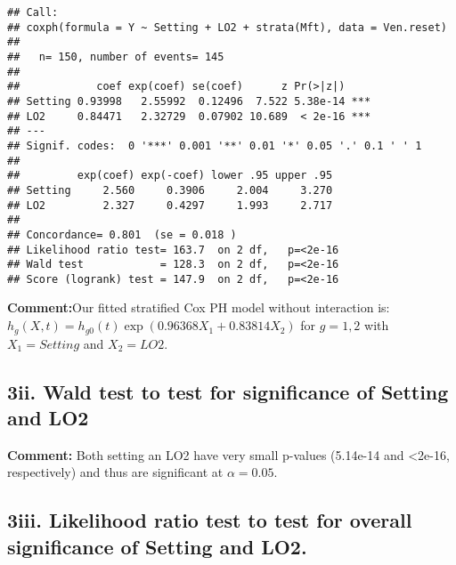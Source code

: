 \documentclass[
]{article}
\newenvironment{Shaded}{\begin{snugshade}}{\end{snugshade}}
\newcommand{\AttributeTok}[1]{\textcolor[rgb]{0.77,0.63,0.00}{#1}}
\newcommand{\CommentTok}[1]{\textcolor[rgb]{0.56,0.35,0.01}{\textit{#1}}}
\newcommand{\DecValTok}[1]{\textcolor[rgb]{0.00,0.00,0.81}{#1}}
\newcommand{\FunctionTok}[1]{\textcolor[rgb]{0.00,0.00,0.00}{#1}}
\newcommand{\NormalTok}[1]{#1}
\newcommand{\OtherTok}[1]{\textcolor[rgb]{0.56,0.35,0.01}{#1}}
\newcommand{\SpecialCharTok}[1]{\textcolor[rgb]{0.00,0.00,0.00}{#1}}
\begin{document}
\begin{Shaded}
\end{Shaded}

\begin{verbatim}
## Call:
## coxph(formula = Y ~ Setting + LO2 + strata(Mft), data = Ven.reset)
## 
##   n= 150, number of events= 145 
## 
##            coef exp(coef) se(coef)      z Pr(>|z|)    
## Setting 0.93998   2.55992  0.12496  7.522 5.38e-14 ***
## LO2     0.84471   2.32729  0.07902 10.689  < 2e-16 ***
## ---
## Signif. codes:  0 '***' 0.001 '**' 0.01 '*' 0.05 '.' 0.1 ' ' 1
## 
##         exp(coef) exp(-coef) lower .95 upper .95
## Setting     2.560     0.3906     2.004     3.270
## LO2         2.327     0.4297     1.993     2.717
## 
## Concordance= 0.801  (se = 0.018 )
## Likelihood ratio test= 163.7  on 2 df,   p=<2e-16
## Wald test            = 128.3  on 2 df,   p=<2e-16
## Score (logrank) test = 147.9  on 2 df,   p=<2e-16
\end{verbatim}

\textbf{Comment:}Our fitted stratified Cox PH model without interaction
is: \(h_g(X,t)=h_{g0}(t)\exp(0.96368X_1+0.83814X_2)\) for \(g=1,2\) with
\(X_1=Setting\) and \(X_2=LO2\).

\hypertarget{ii.-wald-test-to-test-for-significance-of-setting-and-lo2}{%
\subsection{3ii. Wald test to test for significance of Setting and
LO2}\label{ii.-wald-test-to-test-for-significance-of-setting-and-lo2}}

\textbf{Comment:} Both setting an LO2 have very small p-values (5.14e-14
and \textless2e-16, respectively) and thus are significant at
\(\alpha=0.05\).

\hypertarget{iii.-likelihood-ratio-test-to-test-for-overall-significance-of-setting-and-lo2.}{%
\subsection{3iii. Likelihood ratio test to test for overall significance
of Setting and
LO2.}\label{iii.-likelihood-ratio-test-to-test-for-overall-significance-of-setting-and-lo2.}}
\end{document}
